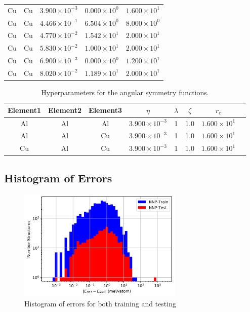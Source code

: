 \documentclass{article}
\renewcommand{\arraystretch}{1.5}
\begin{document}
\begin{longtable}{ccccc}
Cu &  Cu & $3.900 \times 10^{-3}$ & $0.000 \times 10^{0}$ & $1.600 \times 10^{1}$ \\
Cu &  Cu & $4.466 \times 10^{-1}$ & $6.504 \times 10^{0}$ & $8.000 \times 10^{0}$ \\
Cu &  Cu & $4.770 \times 10^{-2}$ & $1.542 \times 10^{1}$ & $2.000 \times 10^{1}$ \\
Cu &  Cu & $5.830 \times 10^{-2}$ & $1.000 \times 10^{1}$ & $2.000 \times 10^{1}$ \\
Cu &  Cu & $6.900 \times 10^{-3}$ & $0.000 \times 10^{0}$ & $1.200 \times 10^{1}$ \\
Cu &  Cu & $8.020 \times 10^{-2}$ & $1.189 \times 10^{1}$ & $2.000 \times 10^{1}$ \\
\hline
\end{longtable}
\egroup

\begin{table}[H]
\caption{Hyperparameters for the angular symmetry functions.}
\centering
\vspace{1em}
\bgroup
\def\arraystretch{1.2}
\begin{tabular}{cccccccc}
\hline
Element1 & Element2 & Element3 & $\eta$ & $\lambda$ & $\zeta$ & $r_c$\\
\hline
\hline
Al &  Al &  Al & $3.900 \times 10^{-3}$ &  1 &  1.0 & $1.600 \times 10^{1}$ \\
Al &  Al &  Cu & $3.900 \times 10^{-3}$ &  1 &  1.0 & $1.600 \times 10^{1}$ \\
Cu &  Al &  Cu & $3.900 \times 10^{-3}$ &  1 &  1.0 & $1.600 \times 10^{1}$ \\
\hline
\end{tabular}
\label{table:symfunc_angular_hypers}
\egroup
\end{table}

\subsection{Histogram of Errors} \label{sct:rsme_histogram}

\begin{figure}[H]%
\centering%
\includegraphics[width=0.7\textwidth,center]{figures/plot_nnperrors_histogram.png}%
\caption{Histogram of errors for both training and testing}%
\end{figure}
\end{document}
